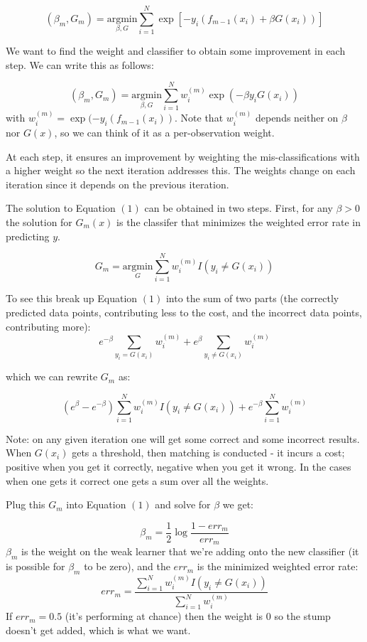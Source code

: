 \documentclass[a4paper]{article}
\begin{document}
$$
(\beta_m, G_m) = \underset{\beta, G} {\mathrm{argmin}} \sum_{i=1}^{N} \exp[-y_i(f_{m-1}(x_i) + \beta G(x_i))]
$$

We want to find the weight and classifier to obtain some improvement in each step. We can write this as follows:

\begin{equation}
(\beta_m, G_m) = \underset{\beta, G} {\mathrm{argmin}} \sum_{i=1}^{N} w_i^{(m)} \exp(-\beta y_i G(x_i))
\end{equation}
with $w_i^{(m)} = \exp(-y_i(f_{m-1}(x_i))$. Note that $w_i^{(m)}$ depends neither on $\beta$ nor $G(x)$, so we can think of it as a per-observation weight.

At each step, it ensures an improvement by weighting the mis-classifications with a higher weight so the next iteration addresses this.  The weights change on each iteration since it depends on the previous iteration.

The solution to Equation $(1)$ can be obtained in two steps. First, for any $\beta > 0$ the solution for $G_m(x)$ is the classifer that minimizes the weighted error rate in predicting $y$.  

\begin{equation}
G_m = \underset{G} {\mathrm{argmin}} \sum_{i=1}^N w_i^{(m)} I(y_i \neq G(x_i))
\end{equation}

To see this break up Equation $(1)$ into the sum of two parts (the correctly predicted data points, contributing less to the cost, and the incorrect data points, contributing more):
$$e^{-\beta} \sum_{y_i = G(x_i)} w_i^{(m)} + e^\beta \sum_{y_i \neq G(x_i)} w_i^{(m)}$$

which we can rewrite $G_m$ as: 

$$(e^\beta-e^{-\beta}) \sum_{i=1}^N w_i^{(m)} I(y_i \neq G(x_i)) + e^{-\beta} \sum_{i=1}^N w_i^{(m)}$$

Note: on any given iteration one will get some correct and some incorrect results. When $G(x_i)$ gets a threshold, then matching is conducted - it incurs a cost; positive when you get it correctly, negative when you get it wrong. In the cases when one gets it correct one gets a sum over all the weights.

Plug this $G_m$ into Equation $(1)$ and solve for $\beta$ we get:

$$
\beta_m = \frac{1}{2} \log \frac{1-err_m}{err_m}
$$
$\beta_m$ is the weight on the weak learner that we're adding onto the new classifier (it is possible for $\beta_m$ to be zero), and the ${err_m}$ is the minimized weighted error rate:
$$
err_m = \frac{\sum_{i=1}^{N} w_i^{(m)} I(y_i \neq G(x_i))}{\sum_{i=1}^{N} w_i^{(m)}}
$$
If $err_m = 0.5$ (it's performing at chance) then the weight is $0$ so the stump doesn't get added, which is what we want.  
\end{document}
